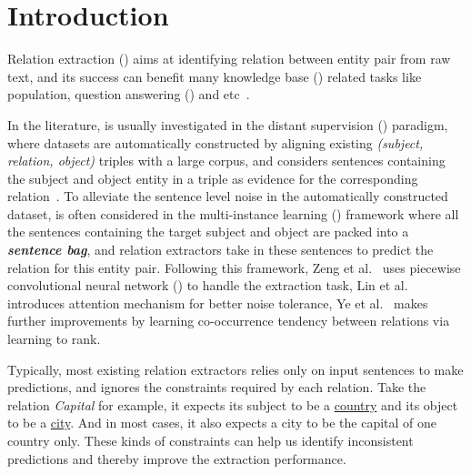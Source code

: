 \section{Introduction}

Relation extraction (\RE) aims at identifying relation between entity pair from raw text, and its success can benefit  many knowledge base (\KB) related tasks like \KB population, question answering (\QA) and etc~\cite{suchanek2013advances}.

In the literature, \RE is usually investigated in the distant supervision (\DS) paradigm, where datasets are automatically constructed by aligning existing \KB \emph{(subject, relation, object)} triples with a large corpus, and considers sentences containing the subject and object entity in a triple as evidence for the corresponding relation~\cite{riedel2010modeling}.
To alleviate the sentence level noise in the automatically constructed dataset, \RE is often considered in the multi-instance learning (\MIL) framework where all the sentences containing the target subject and object are packed into a \textbf{\emph{sentence bag}}, and relation extractors take in these sentences to predict the relation for this entity pair. 
Following this framework, Zeng et al.~ uses piecewise convolutional neural network (\PCNN) to handle the extraction task, Lin et al.~ introduces attention mechanism for better noise tolerance,
Ye et al.~ makes further improvements by learning co-occurrence tendency between relations via learning to rank.

Typically, most existing relation extractors relies only on input sentences to make predictions, and ignores the constraints required by each relation.
Take the relation \emph{Capital} for example, it expects its subject to be a \underline{country} and its object to be a \underline{city}.
And in most cases, it also expects a city to be the capital of one country only.
These kinds of constraints can help us identify inconsistent predictions and thereby improve the extraction performance.

